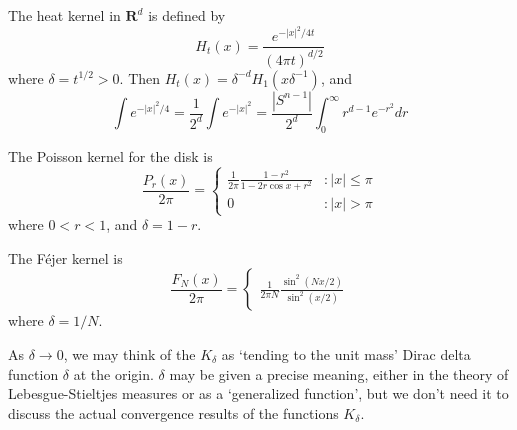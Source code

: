 \begin{example}
    The heat kernel in $\mathbf{R}^d$ is defined by
    \[ H_t(x) = \frac{e^{-|x|^2/4t}}{(4 \pi t)^{d/2}} \]
    where $\delta = t^{1/2} > 0$. Then $H_t(x) = \delta^{-d} H_1(x\delta^{-1})$, and
    \[ \int e^{-|x|^2/4} = \frac{1}{2^d} \int e^{-|x|^2} = \frac{|S^{n-1}|}{2^d} \int_0^\infty r^{d-1} e^{-r^2} dr \]
\end{example}

\begin{example}
    The Poisson kernel for the disk is
    \[ \frac{P_r(x)}{2 \pi} = \begin{cases} \frac{1}{2\pi} \frac{1 - r^2}{1 - 2r \cos x + r^2} &: |x| \leq \pi \\ 0 &: |x| > \pi \end{cases} \]
    where $0 < r < 1$, and $\delta = 1-r$.
\end{example}

\begin{example}
    The F\'{e}jer kernel is
    \[ \frac{F_N(x)}{2 \pi} = \begin{cases} \frac{1}{2 \pi N} \frac{\sin^2(Nx/2)}{\sin^2(x/2)} \end{cases} \]
    where $\delta = 1/N$.
\end{example}

As $\delta \to 0$, we may think of the $K_\delta$ as `tending to the unit mass' Dirac delta function $\delta$ at the origin. $\delta$ may be given a precise meaning, either in the theory of Lebesgue-Stieltjes measures or as a `generalized function', but we don't need it to discuss the actual convergence results of the functions $K_\delta$.

